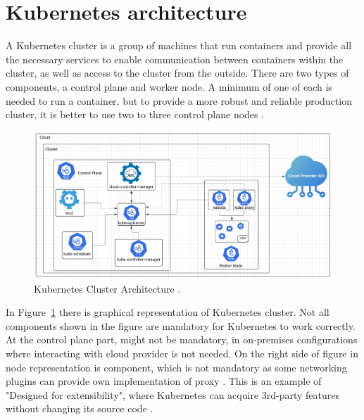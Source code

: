 
\section{Kubernetes architecture}
\label{sec:k8s_arch}
A Kubernetes cluster is a group of machines that run containers and provide all the necessary services to enable communication between containers within the cluster, as well as access to the cluster from the outside. There are two types of components, a control plane and worker node. A minimum of one of each is needed to run a container, but to provide a more robust and reliable production cluster, it is better to use two to three control plane nodes  \cite{KubernetesArch}. 

\begin{figure}[tbh]
    \centering
    \includegraphics[width=1\columnwidth]{images/kubernetes-cluster-architecture.png}
    \caption{Kubernetes Cluster Architecture \cite{KubernetesArch}\cite{CloudIcon}\cite{K8sIcons}\cite{EtcdIcon}\cite{LucidApp}.}
    \label{fig:k8s_arch}
\end{figure}

In Figure~\ref{fig:k8s_arch} there is graphical representation of Kubernetes cluster. Not all components shown in the figure are mandatory for Kubernetes to work correctly. At the control plane part, \textit{} might not be mandatory, in on-premises configurations where interacting with cloud provider is not needed. On the right side of figure in node representation is \textit{} component, which is not mandatory as some networking plugins can provide own implementation of proxy \cite{KubernetesArch}. This is an example of "Designed for extensibility", where Kubernetes can acquire 3rd-party features without changing its source code \cite{KubernetesDocs}.


